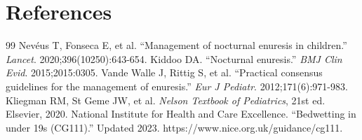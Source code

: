 \section*{References}
\begin{thebibliography}{99}
 Nevéus T, Fonseca E, et al. ``Management of nocturnal enuresis in children.'' \textit{Lancet}. 2020;396(10250):643-654.
 Kiddoo DA. ``Nocturnal enuresis.'' \textit{BMJ Clin Evid}. 2015;2015:0305.
 Vande Walle J, Rittig S, et al. ``Practical consensus guidelines for the management of enuresis.'' \textit{Eur J Pediatr}. 2012;171(6):971-983.
 Kliegman RM, St Geme JW, et al. \textit{Nelson Textbook of Pediatrics}, 21st ed. Elsevier, 2020.
 National Institute for Health and Care Excellence. ``Bedwetting in under 19s (CG111).'' Updated 2023. https://www.nice.org.uk/guidance/cg111.
\end{thebibliography}
